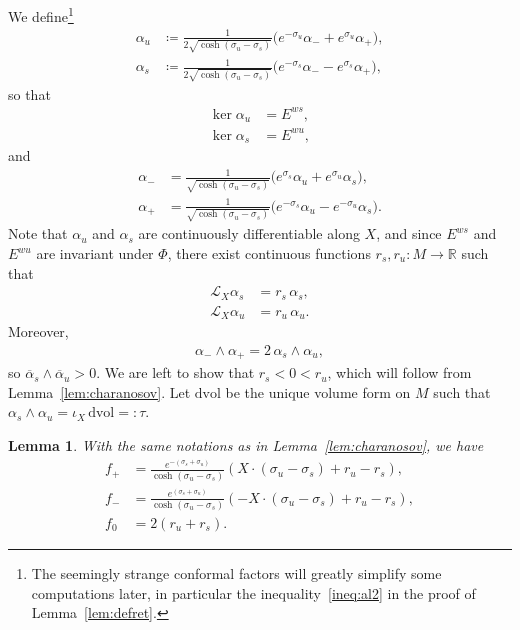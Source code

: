 \documentclass[letterpaper, 11pt]{article}
\numberwithin{equation}{section}
\newtheorem{lem}[thm]{Lemma}
\newcommand{\R}{\mathbb{R}}
\begin{document}
We define\footnote{The seemingly strange conformal factors will greatly simplify some computations later, in particular the inequality~\eqref{ineq:al2} in the proof of Lemma~\ref{lem:defret}.}
\begin{align*}
    \alpha_u &\coloneqq \frac{1}{2 \sqrt{\cosh(\sigma_u - \sigma_s)}} \big(e^{-\sigma_u} \alpha_- + e^{\sigma_u} \alpha_+ \big), \\
    \alpha_s &\coloneqq \frac{1}{2 \sqrt{\cosh(\sigma_u - \sigma_s)}} \big(e^{-\sigma_s} \alpha_- -e^{\sigma_s} \alpha_+\big),
\end{align*}
so that
\begin{align*}
    \ker \alpha_u &= E^{ws},\\
    \ker \alpha_s &= E^{wu},
\end{align*}
and
\begin{align}
    \alpha_- &= \frac{1}{\sqrt{\cosh(\sigma_u-\sigma_s)}}\big(e^{\sigma_s} \alpha_u + e^{\sigma_u} \alpha_s\big), \label{eq:alpha-} \\
    \alpha_+ &= \frac{1}{\sqrt{\cosh(\sigma_u-\sigma_s)}}\big(e^{-\sigma_s} \alpha_u - e^{-\sigma_u} \alpha_s\big). \label{eq:alpha+}
\end{align}
Note that $\alpha_u$ and $\alpha_s$ are continuously differentiable along $X$, and since $E^{ws}$ and $E^{wu}$ are invariant under $\Phi$, there exist continuous functions $r_s, r_u : M \rightarrow \R$ such that 
\begin{align*}
\mathcal{L}_X \alpha_s &= r_s \, \alpha_s,\\
\mathcal{L}_X \alpha_u &= r_u \, \alpha_u.
\end{align*}
Moreover, 
\begin{align*}
\alpha_- \wedge \alpha_+ = 2 \, \alpha_s \wedge \alpha_u,
\end{align*}
so $\overline{\alpha}_s \wedge \overline{\alpha}_u > 0$. We are left to show that $r_s < 0 < r_u$, which will follow from Lemma~\ref{lem:charanosov}. Let $\mathrm{dvol}$ be the unique volume form on $M$ such that $\alpha_s \wedge \alpha_u = \iota_X \, \mathrm{dvol}=: \tau$.

\begin{lem} \label{lem:approx2}
With the same notations as in Lemma~\ref{lem:charanosov}, we have
\begin{align}
    f_+ &= \frac{e^{-(\sigma_s + \sigma_u)}}{\cosh(\sigma_u-\sigma_s)} \left( X\cdot(\sigma_u-\sigma_s) + r_u - r_s\right), \label{eqsigma1}\\
    f_- &= \frac{e^{(\sigma_s + \sigma_u)}}{\cosh(\sigma_u-\sigma_s)} \left( -X\cdot(\sigma_u-\sigma_s) + r_u - r_s\right), \label{eqsigma2}\\
    f_0 &= 2 (r_u+r_s). \label{eqsigma3}
\end{align}
\end{lem}
\end{document}
